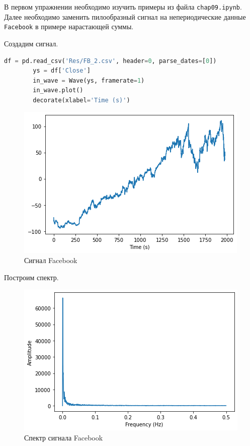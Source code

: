 \documentclass[a4paper, 14pt]{extarticle}
\begin{document}
    В первом упражнении необходимо изучить примеры из файла \texttt{chap09.ipynb}.
    Далее необходимо заменить пилообразный сигнал на непериодические данные \texttt{Facebook} в примере нарастающей суммы.

    Создадим сигнал.

    \begin{lstlisting}[language=Python, caption= Создание сигнала facebook, label={lst:make_signal_fb}]
        df = pd.read_csv('Res/FB_2.csv', header=0, parse_dates=[0])
        ys = df['Close']
        in_wave = Wave(ys, framerate=1)
        in_wave.plot()
        decorate(xlabel='Time (s)')
    \end{lstlisting}

    \begin{figure}[H]
        \centering
        \includegraphics[width=0.8\linewidth]{signal_facebook}
        \caption{Сигнал Facebook}
        \label{fig:signal_facebook}
    \end{figure}

    Построим спектр.

    \begin{figure}[H]
        \centering
        \includegraphics[width=0.8\linewidth]{facebook_spectrum}
        \caption{Спектр сигнала Facebook}
        \label{fig:facebook_spectrum}
    \end{figure}
\end{document}
